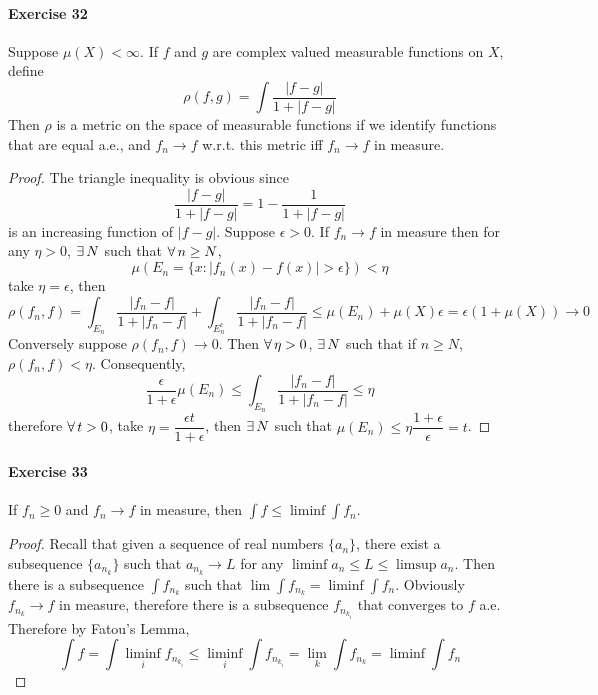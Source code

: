 \paragraph{Exercise 32}
Suppose $\mu(X)<\infty$. If $f$ and $g$ are complex valued measurable functions on $X$, define
$$
\rho(f,g)=\int\dfrac{|f-g|}{1+|f-g|}
$$
Then $\rho$ is a metric on the space of measurable functions if we identify functions that are equal a.e., and $f_n\to f$ w.r.t. this metric iff $f_n\to f$ in measure.
\begin{proof}
    The triangle inequality is obvious since
    $$
    \dfrac{|f-g|}{1+|f-g|}=1-\dfrac{1}{1+|f-g|}
    $$
    is an increasing function of $|f-g|$. Suppose $\epsilon>0$. If $f_n\to f$ in measure then for any $\eta>0$, $\exists\, N$ such that $\forall\, n\ge N$,
    $$
    \mu(E_n=\{x:|f_n(x)-f(x)|>\epsilon\})<\eta
    $$
    take $\eta=\epsilon$, then
    $$
    \rho(f_n,f)=\int_{E_n}\dfrac{|f_n-f|}{1+|f_n-f|}+\int_{E_n^c}\dfrac{|f_n-f|}{1+|f_n-f|}\le\mu(E_n)+\mu(X)\epsilon=\epsilon(1+\mu(X))\to 0
    $$
    Conversely suppose $\rho(f_n,f)\to 0$. Then $\forall\,\eta>0$, $\exists\, N$ such that if $n\ge N$, $\rho(f_n,f)<\eta$. Consequently,
    $$
    \dfrac{\epsilon}{1+\epsilon}\mu(E_n)\le\int_{E_n}\dfrac{|f_n-f|}{1+|f_n-f|}\le\eta
    $$
    therefore $\forall\, t>0$, take $\eta=\dfrac{\epsilon t}{1+\epsilon}$, then $\exists\, N$ such that $\mu(E_n)\le\eta\dfrac{1+\epsilon}{\epsilon}=t$.
\end{proof}
\paragraph{Exercise 33}
If $f_n\ge 0$ and $f_n\to f$ in measure, then $\int f\le\liminf\int f_n$. 
\begin{proof}
    Recall that given a sequence of real numbers $\{a_{n}\}$, there exist a subsequence $\{a_{n_k}\}$ such that $a_{n_k}\to L$ for any $\liminf a_n\le L\le\limsup a_n$. Then there is a subsequence $\int f_{n_k}$ such that $\lim\int f_{n_k}=\liminf\int f_n$. Obviously $f_{n_k}\to f$ in measure, therefore there is a subsequence $f_{n_{k_i}}$ that converges to $f$ a.e. Therefore by Fatou's Lemma,
    $$
    \int f=\int\liminf_i f_{n_{k_i}}\le\liminf_i\int f_{n_{k_i}}=\lim_k\int f_{n_k}=\liminf\int f_n
    $$
\end{proof}
